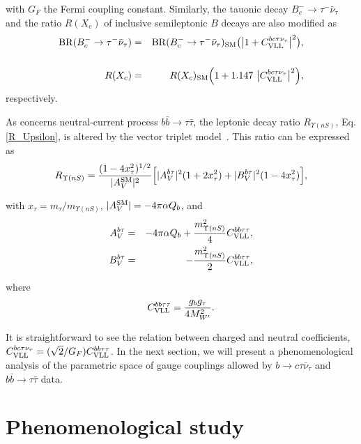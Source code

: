 \documentclass[reprint,showpacs,aps,prd,nofootinbib,superscriptaddress,longbibliography]{revtex4-1}
\begin{document}
\noindent with $G_F$ the Fermi coupling constant. Similarly, the tauonic decay $B_c^- \to \tau^- \bar{\nu}_{\tau}$ and the ratio $R(X_c)$ of inclusive semileptonic $B$ decays are also modified as~\cite{Gomez:2019xfw,Kamali:2018bdp}
\begin{eqnarray} \label{BRBc_modified}
{\rm BR}(B_c^- \to \tau^- \bar{\nu}_{\tau}) &=& {\rm BR}(B_c^- \to \tau^- \bar{\nu}_{\tau})_{\text{SM}}   \big(\big|1+C_{\rm VLL}^{bc\tau\nu_\tau} \big|^2 \big), \nonumber  \\  \\ 
R(X_c) &=& R(X_c)_{\rm SM} \Big( 1+ 1.147 \ \big|C_{\rm VLL}^{bc\tau\nu_\tau}\big|^2 \Big), \label{RXc}
\end{eqnarray}
\noindent respectively.

As concerns neutral-current process $b  \bar{b} \to \tau \bar{\tau}$, the leptonic decay ratio $R_{\Upsilon(nS)}$, Eq.\eqref{R_Upsilon}, is altered by the vector triplet model~\cite{Aloni:2017eny}. This ratio can be expressed as~\cite{Aloni:2017eny}
\begin{equation}
R_{\Upsilon(nS)}= \frac{(1-4x_\tau^2)^{1/2}}{\vert A_V^{\rm SM} \vert^2} \Big[ \vert A_V^{b\tau} \vert^2 (1+2x_\tau^2) + \vert B_V^{b\tau} \vert^2 (1- 4x_\tau^2) \Big],
\end{equation}

\noindent with $x_\tau = m_\tau/m_{\Upsilon(nS)}$, $\vert A_V^{\rm SM} \vert = - 4\pi\alpha Q_b$, and 
\begin{eqnarray}
A_V^{b\tau} &=& - 4\pi\alpha Q_b + \frac{m_{\Upsilon(nS)}^2}{4} C_{\rm VLL}^{bb\tau\tau}, \\
B_V^{b\tau} &=&- \frac{m_{\Upsilon(nS)}^2}{2} C_{\rm VLL}^{bb\tau\tau},
\end{eqnarray}

\noindent where 
\begin{equation}
C_{\rm VLL}^{bb\tau\tau} = \frac{g_b g_\tau}{4M_{W^\prime}^2}.
\end{equation}

\noindent It is straightforward to see the relation between charged and neutral coefficients, $C_{\rm VLL}^{bc\tau\nu_\tau}  = (\sqrt{2}/G_F) C_{\rm VLL}^{bb\tau\tau}$. In the next section, we will present a phenomenological analysis of the parametric space of gauge couplings allowed by $b \to c \tau \bar{\nu}_{\tau}$ and $b  \bar{b} \to \tau \bar{\tau}$ data.


\section{Phenomenological study} \label{analysis}
\end{document}
